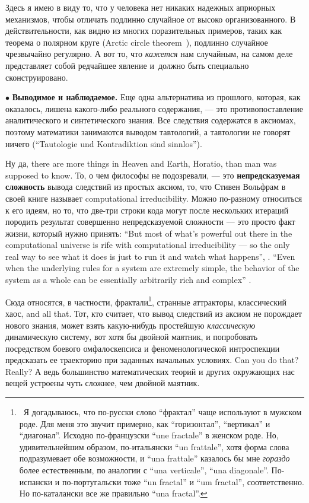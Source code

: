 \documentclass[intlimits,twoside,a4paper,11pt]{article}
\begin{document}
		Здесь я имею в виду то, что у человека нет никаких надежных априорных 
		механизмов, чтобы отличать подлинно случайное от высоко организованного.
		В действительности, как видно из многих поразительных примеров, таких как теорема о полярном круге (Arctic circle theorem~\cite{JPS}),
		подлинно случайное чрезвычайно регулярно. А вот то, что {\it кажется\/} 
		нам случайным, на самом деле представляет собой редчайшее 
		явление и~должно быть специально сконструировано.
		
		
		\par\smallskip
		$\bullet$ {\bf Выводимое и наблюдаемое.} Еще одна альтернатива
		из прошлого, которая, как оказалось, лишена какого-либо реального содержания, ---
		это противопоставление аналитического и 
		синтетического знания. Все следствия содержатся в аксиомах, поэтому 
		математики занимаются выводом тавтологий, а тавтологии не говорят 
		ничего (``Tautologie und Kontradiktion sind sinnlos'').
		
		
		Ну да, there are more things in Heaven and Earth, Horatio, than
		man was supposed to know. 
		То, о  чем философы не подозревали, --- это {\bf непредсказуемая сложность}
		вывода следствий из простых аксиом, то, что Стивен Вольфрам в своей 
		книге \cite{W02} называет computational irreducibility. Можно по-разному
		относиться к его идеям, но то, что две-три строки кода могут после
		нескольких итераций породить результат совершенно непредсказуемой 
		сложности --- это просто факт жизни, который нужно принять: ``But most of 
		what’s powerful out there in the computational universe is rife with computational 
		irreducibility — so the only real way to see what it does is just to run it and watch 
		what happens'', \cite{W02}. ``Even when the underlying rules for a system are 
		extremely simple, the behavior of the system as a whole can be essentially 
		arbitrarily rich and complex'' \cite{W20}.
		
		Сюда относятся, в частности, фрактали\footnote{~Я догадываюсь, что по-русски 
			слово ``фрактал''
			чаще используют в мужском роде. Для меня это звучит примерно, как ``горизонтал'',
			``вертикал'' и ``диагонал''. Исходно по-французски ``une fractale'' в женском
			роде. Но, удивительнейшим образом, по-итальянски ``un frattale'', хотя форма слова 
			подразумевает обе возможности, и ``una frattale'' казалось бы мне {\it гораздо\/} 
			более естественным, по аналогии с ``una verticale'', ``una diagonale''. По-испански
			и по-португальски тоже ``un fractal'' и ``um fractal'', соответственно. Но по-каталански 
			все же правильно ``una fractal''.}, странные аттракторы, классический хаос, and 
		all that. Тот, кто считает, что вывод следствий из аксиом не порождает нового знания,
		может взять какую-нибудь простейшую {\it классическую\/} динамическую систему,
		вот хотя бы двойной маятник, и попробовать посредством боевого
		омфалоскепсиса и феноменологической интроспекции предсказать ее траекторию
		при заданных начальных условиях. Can you do that? Really? А ведь большинство 
		математических теорий и других окружающих нас вещей устроены чуть сложнее, чем 
		двойной маятник.
		
\end{document}
